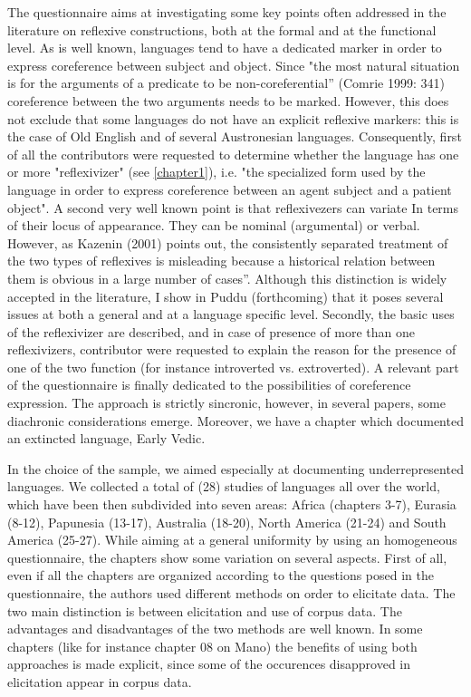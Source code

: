 \documentclass[output=paper]{langscibook}
\begin{document}
The questionnaire aims at investigating some key points often addressed in the literature on reflexive constructions, both at the formal and at the functional level.  As is well known, languages tend to have a dedicated marker in order to express coreference between subject and object. Since "the most natural situation is for the arguments of a predicate to be non-coreferential” (Comrie 1999: 341) coreference between the two arguments needs to be marked. However, this does not exclude that some languages do not have an explicit reflexive markers: this is the case of Old English and of several Austronesian languages. Consequently, first of all the contributors were requested to determine whether the language has one or more "reflexivizer" (see \ref{chapter1}), i.e. "the specialized form used by the language in order to express coreference between an agent subject and a patient object".
A second very well known point is that reflexivezers can variate In terms of their locus of appearance. They can be nominal (argumental) or verbal. However, as Kazenin (2001) points out, the consistently separated treatment of the two types of reflexives is misleading because a historical relation between them is obvious in a large number of cases”. Although this distinction is widely accepted in the literature, I show in Puddu (forthcoming) that it poses several issues at both a general and at a language specific level.
Secondly, the basic uses of the reflexivizer are described, and in case of presence of more than one reflexivizers, contributor were requested to explain the reason for the presence of one of the two function (for instance introverted vs. extroverted). A relevant part of the questionnaire is finally dedicated to the possibilities of coreference expression.
The approach is strictly sincronic, however, in several papers, some diachronic considerations emerge. Moreover, we have a chapter which documented an extincted language, Early Vedic.

In the choice of the sample, we aimed especially at documenting underrepresented languages. We collected a total of (28) studies of languages all over the world, which have been then subdivided into seven areas: Africa (chapters 3-7), Eurasia (8-12), Papunesia (13-17), Australia  (18-20), North America (21-24) and South America (25-27). While aiming at a general uniformity by using an homogeneous questionnaire, the chapters show some variation on several aspects.
First of all, even if all the chapters are organized according to the questions posed in the questionnaire,  the authors used different methods on order to elicitate data. The two main distinction is between elicitation and use of corpus data. The advantages and disadvantages of the two methods are well known. In some chapters (like for instance chapter 08 on Mano) the benefits of using both approaches is made explicit, since some of the occurences disapproved in elicitation appear in corpus data. 
\end{document}
